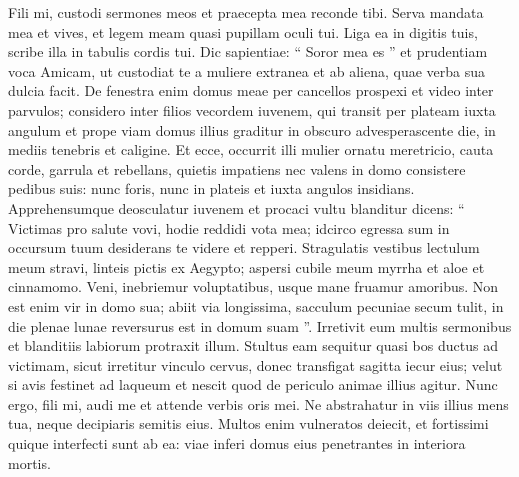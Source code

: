 \begin{biblechapter}
\begin{biblechapter}
\begin{biblechapter}
\begin{biblechapter}
\begin{biblechapter}
\begin{biblechapter}
\begin{biblechapter}
 \verse Fili mi, custodi sermones meos
 et praecepta mea reconde tibi.
 \verse Serva mandata mea et vives,
 et legem meam quasi pupillam oculi tui.
 \verse Liga ea in digitis tuis,
 scribe illa in tabulis cordis tui.
 \verse Dic sapientiae: “ Soror mea es ”
 et prudentiam voca Amicam,
 \verse ut custodiat te a muliere extranea
 et ab aliena, quae verba sua dulcia facit.
 \verse De fenestra enim domus meae
 per cancellos prospexi
 \verse et video inter parvulos;
 considero inter filios vecordem iuvenem,
 \verse qui transit per plateam iuxta angulum
 et prope viam domus illius graditur
 \verse in obscuro advesperascente die,
 in mediis tenebris et caligine.
 \verse Et ecce, occurrit illi mulier ornatu meretricio,
 cauta corde, garrula et rebellans,
 \verse quietis impatiens
 nec valens in domo consistere pedibus suis:
 \verse nunc foris, nunc in plateis
 et iuxta angulos insidians.
 \verse Apprehensumque deosculatur iuvenem
 et procaci vultu blanditur dicens:
 \verse “ Victimas pro salute vovi,
 hodie reddidi vota mea;
 \verse idcirco egressa sum in occursum tuum
 desiderans te videre et repperi.
 \verse Stragulatis vestibus lectulum meum stravi,
 linteis pictis ex Aegypto;
 \verse aspersi cubile meum myrrha
 et aloe et cinnamomo.
 \verse Veni, inebriemur voluptatibus,
 usque mane fruamur amoribus.
 \verse Non est enim vir in domo sua;
 abiit via longissima,
 \verse sacculum pecuniae secum tulit,
 in die plenae lunae reversurus est in domum suam ”.
 \verse Irretivit eum multis sermonibus
 et blanditiis labiorum protraxit illum.
 \verse Stultus eam sequitur quasi bos ductus ad victimam,
 sicut irretitur vinculo cervus,
 \verse donec transfigat sagitta iecur eius;
 velut si avis festinet ad laqueum
 et nescit quod de periculo animae illius agitur.
 \verse Nunc ergo, fili mi, audi me
 et attende verbis oris mei.
 \verse Ne abstrahatur in viis illius mens tua,
 neque decipiaris semitis eius.
 \verse Multos enim vulneratos deiecit,
 et fortissimi quique interfecti sunt ab ea:
 \verse viae inferi domus eius
 penetrantes in interiora mortis.
 

\end{biblechapter}
\end{biblechapter}
\end{biblechapter}
\end{biblechapter}
\end{biblechapter}
\end{biblechapter}
\end{biblechapter}

